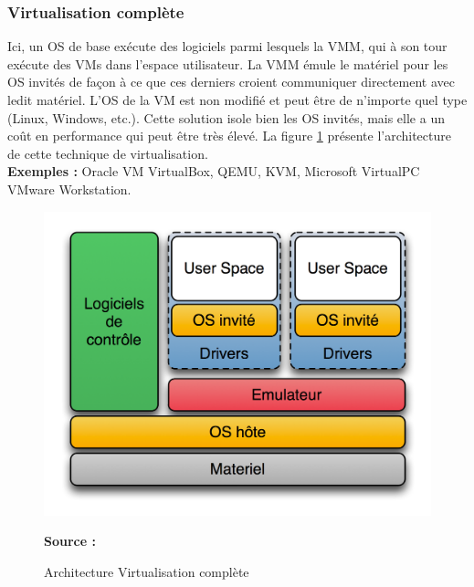     \subsubsection{Virtualisation complète}
    Ici, un OS de base exécute des logiciels parmi lesquels la VMM, qui à son tour exécute des VMs dans l'espace utilisateur. La VMM émule le matériel pour les OS invités de façon à ce que ces derniers croient communiquer directement avec ledit matériel. L'OS de la VM est non modifié et peut être de n'importe quel type (Linux, Windows, etc.). Cette solution isole bien les OS invités, mais elle a un coût en performance qui peut être très élevé.  La figure \ref{fig:virualisation_complete} présente l'architecture de cette technique de virtualisation.
    \\ \textbf{Exemples :} Oracle VM VirtualBox, QEMU, KVM, Microsoft VirtualPC VMware Workstation.
    \begin{figure}[htp]
      \centering
      \includegraphics[scale=.8]{fig1/virtualisation_complete.png}
      \caption{Architecture Virtualisation complète}
      \label{fig:virualisation_complete}
      \centering \bfseries Source : \cite{online2}
    \end{figure}
    
